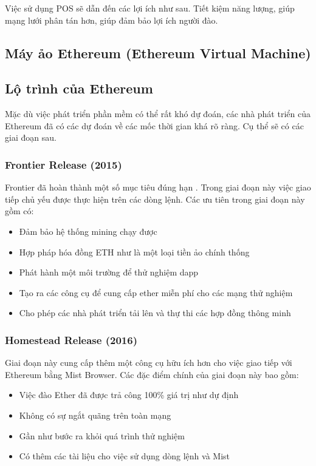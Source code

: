 \documentclass[12pt]{article}
\begin{document}
Việc sử dụng POS sẽ dẫn đến các lợi ích như sau. Tiết kiệm năng lượng, giúp mạng lưới phân tán hơn, giúp đảm bảo lợi ích người đào. 
	\subsection{Máy ảo Ethereum (Ethereum Virtual Machine)}
	
	
	\subsection{Lộ trình của Ethereum}
	Mặc dù việc phát triển phần mềm có thể rất khó dự đoán, các nhà phát triển của Ethereum đã có các dự đoán về các mốc thời gian khá rõ ràng. Cụ thể sẽ có các giai đoạn sau.
	\subsubsection{Frontier Release (2015)}
	Frontier đã hoàn thành một số mục tiêu đúng hạn . Trong giai đoạn này việc giao tiếp chủ yếu được thực hiện trên các dòng lệnh. Các ưu tiên trong giai đoạn này gồm có:
	\begin{itemize}
  		\item Đảm bảo hệ thống mining chạy được
  		\item Hợp pháp hóa đồng ETH như là một loại tiền ảo chính thống
  		\item Phát hành một môi trường để thử nghiệm dapp
  		\item Tạo ra các công cụ để cung cấp ether miễn phí cho các mạng thử nghiệm
  		\item Cho phép các nhà phát triển tải lên và thự thi các hợp đồng thông minh
	\end{itemize}

	\subsubsection{Homestead Release (2016)}
	Giai đoạn này cung cấp thêm một công cụ hữu ích hơn cho việc giao tiếp với Ethereum bằng Mist Browser. Các đặc điểm chính của giai đoạn này bao gồm:
	\begin{itemize}
  		\item Việc đào Ether đã được trả công 100\% giá trị như dự định
  		\item Không có sự ngắt quãng trên toàn mạng
  		\item Gần như bước ra khỏi quá trình thử nghiệm
  		\item Có thêm các tài liệu cho việc sử dụng dòng lệnh và Mist
	\end{itemize}
	
\end{document}

